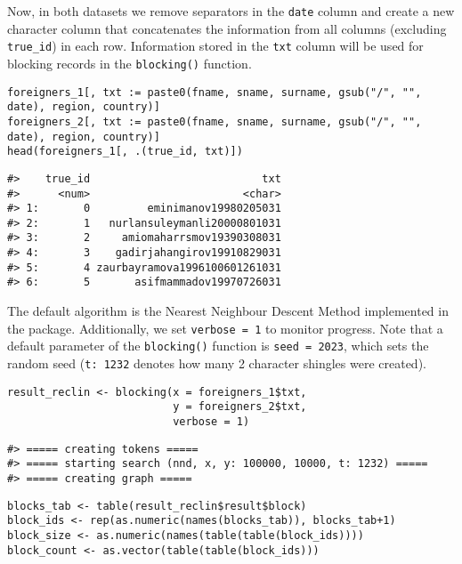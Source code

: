 Now, in both datasets we remove separators in the \texttt{date} column and
create a new character column that concatenates the information from all
columns (excluding \texttt{true\_id}) in each row. Information stored in the \texttt{txt} column will be used
for blocking records in the \texttt{blocking()} function.

\begin{verbatim}
foreigners_1[, txt := paste0(fname, sname, surname, gsub("/", "", date), region, country)]
foreigners_2[, txt := paste0(fname, sname, surname, gsub("/", "", date), region, country)]
head(foreigners_1[, .(true_id, txt)])
\end{verbatim}

\begin{verbatim}
#>    true_id                           txt
#>      <num>                        <char>
#> 1:       0         eminimanov19980205031
#> 2:       1   nurlansuleymanli20000801031
#> 3:       2     amiomaharrsmov19390308031
#> 4:       3    gadirjahangirov19910829031
#> 5:       4 zaurbayramova1996100601261031
#> 6:       5       asifmammadov19970726031
\end{verbatim}

The default algorithm is the Nearest Neighbour Descent Method \citep{Dong2011} implemented in
the  package. Additionally, we set \texttt{verbose\ =\ 1} to monitor progress. Note
that a default parameter of the \texttt{blocking()} function is \texttt{seed\ =\ 2023},
which sets the random seed (\texttt{t:\ 1232} denotes how many 2 character shingles were created).

\begin{verbatim}
result_reclin <- blocking(x = foreigners_1$txt,
                          y = foreigners_2$txt,
                          verbose = 1)
\end{verbatim}

\begin{verbatim}
#> ===== creating tokens =====
#> ===== starting search (nnd, x, y: 100000, 10000, t: 1232) =====
#> ===== creating graph =====
\end{verbatim}

\begin{verbatim}
blocks_tab <- table(result_reclin$result$block)
block_ids <- rep(as.numeric(names(blocks_tab)), blocks_tab+1)
block_size <- as.numeric(names(table(table(block_ids))))
block_count <- as.vector(table(table(block_ids)))
\end{verbatim}

